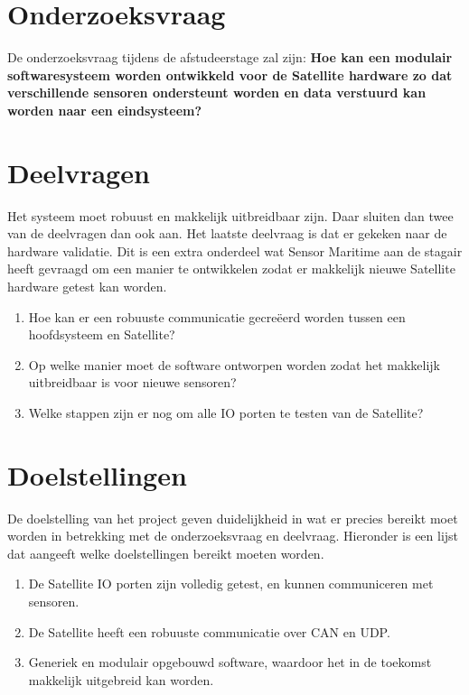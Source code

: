 \section{Onderzoeksvraag}
De onderzoeksvraag tijdens de afstudeerstage zal zijn: \textbf{Hoe kan een modulair softwaresysteem worden ontwikkeld voor de Satellite hardware zo dat verschillende sensoren ondersteunt worden en data verstuurd kan worden naar een eindsysteem?}

\section{Deelvragen}
Het systeem moet robuust en makkelijk uitbreidbaar zijn. Daar sluiten dan twee van de deelvragen dan ook aan. Het laatste deelvraag is dat er gekeken naar de hardware validatie. Dit is een extra onderdeel wat Sensor Maritime aan de stagair heeft gevraagd om een manier te ontwikkelen zodat er makkelijk nieuwe Satellite hardware getest kan worden.
\begin{enumerate}
	\item Hoe kan er een robuuste  communicatie gecreëerd worden tussen een hoofdsysteem en Satellite?
	\item Op welke manier moet de software ontworpen worden zodat het makkelijk uitbreidbaar is voor nieuwe sensoren?
	\item Welke stappen zijn er nog om alle IO porten te testen van de Satellite?
\end{enumerate}

\section{Doelstellingen}
De doelstelling van het project geven duidelijkheid in wat er precies bereikt moet worden in betrekking met de onderzoeksvraag en deelvraag. Hieronder is een lijst dat aangeeft welke doelstellingen bereikt moeten worden.
\begin{enumerate}
	\item De Satellite IO porten zijn volledig getest, en kunnen communiceren met sensoren.
	\item De Satellite heeft een robuuste communicatie over CAN en UDP. 
	\item Generiek en modulair opgebouwd software, waardoor het in de toekomst makkelijk uitgebreid kan worden.
\end{enumerate}

\newpage
